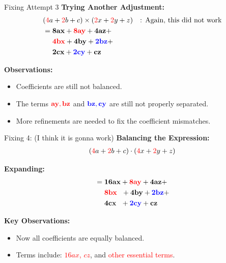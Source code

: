 \documentclass{beamer}
\begin{document}
\begin{frame}{Fixing Attempt 3}
    \textbf{Trying Another Adjustment:}
    \begin{align*}
        &(\textcolor{red}{4}a + \textcolor{red}{2}b + c) \times (\textcolor{red}{2}x + \textcolor{red}{2}y + z) \quad \text{: Again, this did not work} \\
        &= \mathbf{8ax} + \textcolor{red}{\mathbf{8ay}} + \mathbf{4az} + \\
        &\ \ \ \ \textcolor{red}{\mathbf{4bx}} + \mathbf{4by} + \textcolor{blue}{\mathbf{2bz}} + \\
        &\  \ \ \ \mathbf{2cx} + \textcolor{blue}{\mathbf{2cy}} + \mathbf{cz}
    \end{align*}

    \textbf{Observations:}
    \begin{itemize}
        \item Coefficients are still not balanced.
        \item The terms $\textcolor{red}{\mathbf{ay, bz}}$ and $\textcolor{blue}{\mathbf{bz, cy}}$ are still not properly separated.
        \item More refinements are needed to fix the coefficient mismatches.
    \end{itemize}
\end{frame}
\begin{frame}{Fixing 4: (I think it is gonna work)}
    \textbf{Balancing the Expression:}
    \begin{align*}
        (\textcolor{red}{4}a + \textcolor{red}{2}b + c) \cdot (\textcolor{red}{4}x + \textcolor{red}{2}y + z)
    \end{align*}
    
    \textbf{Expanding:}
    \begin{align*}
        &= \mathbf{16ax} + \textcolor{red}{\mathbf{8ay}} + \mathbf{4az} + \\
        &\ \ \ \ \textcolor{red}{\mathbf{8bx}} \ \ + \mathbf{4by} + \textcolor{blue}{\mathbf{2bz}} + \\
        &\  \ \ \ \mathbf{4cx} \ \ + \textcolor{blue}{\mathbf{2cy}} + \mathbf{cz}
    \end{align*}

    \textbf{Key Observations:}
    \begin{itemize}
        \item Now all coefficients are equally balanced.
        \item Terms include: \textcolor{red}{$16ax$, $cz$}, and \textcolor{red}{other essential terms}.
    \end{itemize}
\end{frame}
\end{document}
